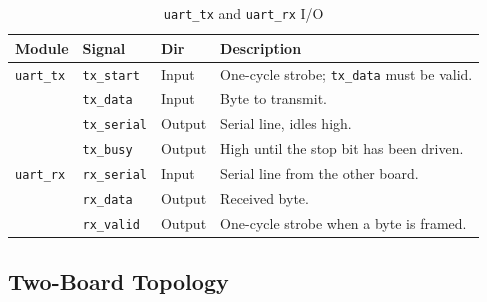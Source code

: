 \documentclass[11pt,a4paper]{article}
\newcommand{\sig}[1]{\texttt{#1}}
\begin{document}
\begin{table}[htbp]
\centering
\caption{\sig{uart\_tx} and \sig{uart\_rx} I/O}
\label{tab:io_uart}
\small
\begin{tabularx}{\textwidth}{lllX}
\toprule
\textbf{Module} & \textbf{Signal} & \textbf{Dir} & \textbf{Description} \\
\midrule
\sig{uart\_tx} & \sig{tx\_start}   & Input  & One-cycle strobe; \sig{tx\_data} must be valid. \\
               & \sig{tx\_data}    & Input  & Byte to transmit. \\
               & \sig{tx\_serial}  & Output & Serial line, idles high. \\
               & \sig{tx\_busy}    & Output & High until the stop bit has been driven. \\
\midrule
\sig{uart\_rx} & \sig{rx\_serial}  & Input  & Serial line from the other board. \\
               & \sig{rx\_data}    & Output & Received byte. \\
               & \sig{rx\_valid}   & Output & One-cycle strobe when a byte is framed. \\
\bottomrule
\end{tabularx}
\end{table}

\subsection{Two-Board Topology}
\end{document}
